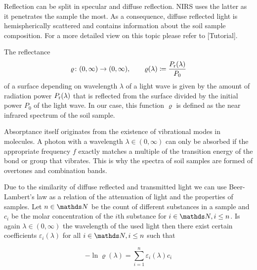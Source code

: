 		Reflection can be split in specular and diffuse reflection.
		NIRS uses the latter as it penetrates the sample the most.
		As a consequence, diffuse reflected light is hemispherically scattered and contains information about the soil sample composition.
		For a more detailed view on this topic please refer to [Tutorial].

		The reflectance 
		\[
			\varrho\colon(0,\infty)\to(0,\infty),\qquad \varrho(\lambda) \coloneqq \frac{P_{\mathrm{r}}(\lambda)}{P_0}
		\]
		of a surface depending on wavelength $\lambda$ of a light wave is given by the amount of radiation power $P_{\mathrm{r}}(\lambda)$ that is reflected from the surface divided by the initial power $P_0$ of the light wave.	
		In our case, this function $\varrho$ is defined as the near infrared spectrum of the soil sample.

		Absorptance itself originates from the existence of vibrational modes in molecules.
		A photon with a wavelength $\lambda \in (0,\infty)$ can only be absorbed if the appropriate frequency $f$ exactly matches a multiple of the transition energy of the bond or group that vibrates.%
		This is why the spectra of soil samples are formed of overtones and combination bands.

		Due to the similarity of diffuse reflected and transmitted light we can use Beer-Lambert's law as a relation of the attenuation of light and the properties of samples.
		Let $n\in\SN$ be the count of different substances in a sample and $c_i$ be the molar concentration of the $i$th substance for $i\in\SN,i\leq n$.
		Is again $\lambda \in (0,\infty)$ the wavelength of the used light then there exist certain coefficients $\varepsilon_i(\lambda)$ for all $i\in\SN,i\leq n$ such that

		\[
			-\ln \varrho(\lambda) = \sum_{i=1}^{n} \varepsilon_i(\lambda) c_i
		\]


